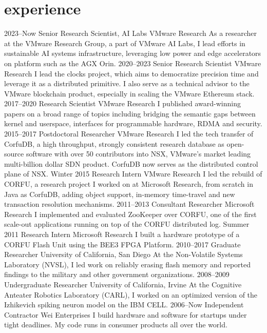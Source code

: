 \section{experience}

\begin{entrylist}
\entry
{2023--Now}
{Senior Research Scientist, AI Labs}
{VMware Research}
{\small As a researcher at the VMware Research Group, a part of VMware AI Labs, I lead efforts in sustainable AI systems infrastructure, leveraging low power and edge accelerators on platform such as the AGX Orin.}
\entry
{2020--2023}
{Senior Research Scientist}
{VMware Research}
{\small I lead the clocks project, which aims to democratize precision time and leverage it as a distributed primitive.
I also serve as a technical advisor to the VMware blockchain product, especially in scaling the VMware Ethereum stack.}
\entry
{2017--2020}
{Research Scientist}
{VMware Research}
{\small I published award-winning papers on a broad range of topics including
 bridging the semantic gaps between kernel and userspace, interfaces for programmable hardware, 
 RDMA and security. }
\entry
{2015--2017}
{Postdoctoral Researcher}
{VMware Research}
{\small I led the tech transfer of CorfuDB, a high throughput, strongly consistent research database 
as open-source software with over 50 contributors into NSX, VMware's market leading multi-billion dollar 
SDN product. CorfuDB now serves as the distributed control plane of NSX.}
\entry
{Winter 2015}
{Research Intern}
{VMware Research}
{\small I led the rebuild of CORFU, a research project I worked on at Microsoft Research, from scratch in Java as CorfuDB, adding object support, in-memory time-travel and new transaction resolution mechanisms.}
\entry
{2011--2013}
{Consultant Researcher}
{Microsoft Research}
{\small I implemented and evaluated ZooKeeper over CORFU, one of the first scale-out applications running on top of the CORFU distributed log.}
\entry
{Summer 2011}
{Research Intern}
{Microsoft Research}
{\small I built a hardware prototype of a CORFU Flash Unit using the BEE3 FPGA Platform.}
\entry
{2010--2017}
{Graduate Researcher}
{University of California, San Diego}
{\small At the Non-Volatile Systems Laboratory (NVSL), I led work on reliably erasing flash memory and reported findings to the military and other government organizations.}
\entry
{2008--2009}
{Undergraduate Researcher}
{University of California, Irvine}
{\small At the Cognitive Anteater Robotics Laboratory (CARL), I worked on an optimized version of the Izhikevich spiking neuron model on the IBM CELL.}
\entry
{2006--Now}
{Independent Contractor}
{Wei Enterprises}
{\small I build hardware and software for startups under tight deadlines. My code runs in consumer products all over the world.}
\end{entrylist}